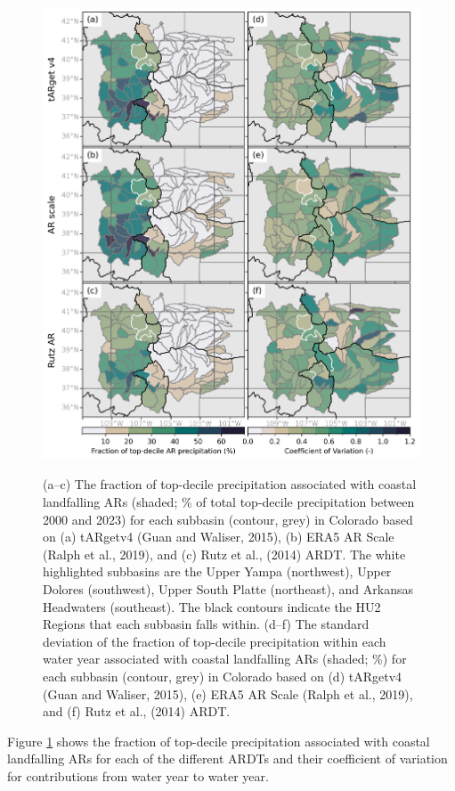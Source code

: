 \documentclass[draft]{agujournal2019}
\begin{document}
\begin{figure}
\noindent\includegraphics[width=\textwidth]{fig3.png}
\label{fig:choropleth}
\caption{(a–c) The fraction of top-decile precipitation associated with coastal landfalling ARs (shaded; \% of total top-decile precipitation between 2000 and 2023) for each subbasin (contour, grey) in Colorado based on (a) tARgetv4 (Guan and Waliser, 2015), (b) ERA5 AR Scale (Ralph et al., 2019), and (c) Rutz et al., (2014) ARDT. The white highlighted subbasins are the Upper Yampa (northwest), Upper Dolores (southwest), Upper South Platte (northeast), and Arkansas Headwaters (southeast). The black contours indicate the HU2 Regions that each subbasin falls within. (d–f) The standard deviation of the fraction of top-decile precipitation within each water year associated with coastal landfalling ARs (shaded; \%) for each subbasin (contour, grey) in Colorado based on (d)  tARgetv4 (Guan and Waliser, 2015), (e) ERA5 AR Scale (Ralph et al., 2019), and (f) Rutz et al., (2014) ARDT. }
\end{figure}

Figure \ref{fig:choropleth} shows the fraction of top-decile precipitation associated with coastal landfalling ARs for each of the different ARDTs and their coefficient of variation for contributions from water year to water year. 
\end{document}
